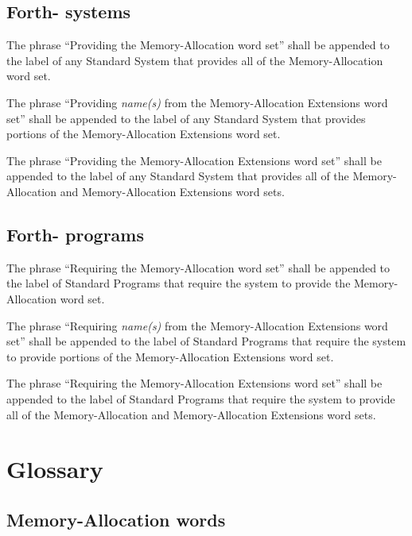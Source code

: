 \cbstart{}
\subsection[Forth-\snapshot systems]{Forth-\snapshot{} systems} %
\cbend

The phrase ``Providing the Memory-Allocation word set'' shall be
appended to the label of any Standard System that provides all of
the Memory-Allocation word set.

The phrase ``Providing \emph{name(s)} from the Memory-Allocation
Extensions word set'' shall be appended to the label of any Standard
System that provides portions of the Memory-Allocation Extensions
word set.

The phrase ``Providing the Memory-Allocation Extensions word set''
shall be appended to the label of any Standard System that provides
all of the Memory-Allocation and Memory-Allocation Extensions word
sets.

\cbstart{}
\subsection[Forth-\snapshot programs]{Forth-\snapshot{} programs} %
\cbend

The phrase ``Requiring the Memory-Allocation word set'' shall be
appended to the label of Standard Programs that require the system
to provide the Memory-Allocation word set.

The phrase ``Requiring \emph{name(s)} from the Memory-Allocation
Extensions word set'' shall be appended to the label of Standard
Programs that require the system to provide portions of the
Memory-Allocation Extensions word set.

The phrase ``Requiring the Memory-Allocation Extensions word set''
shall be appended to the label of Standard Programs that require
the system to provide all of the Memory-Allocation and
Memory-Al\-lo\-ca\-tion Extensions word sets.


\section{Glossary} %

\subsection{Memory-Allocation words} %

